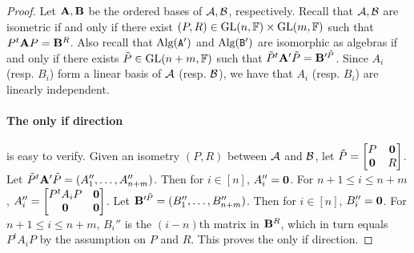 \documentclass[11pt]{article}
\begin{document}
\begin{proof}
Let $\mathbf{A},\mathbf{B}$ be the ordered bases of $\mathcal{A}, \mathcal{B}$, respectively. Recall that $\mathcal{A}, \mathcal{B}$ are isometric if and only if there exist 
$(P, R) \in\mathrm{GL}(n, \mathbb{F}) \times \mathrm{GL}(m, \mathbb{F})$ such that $P^t\mathbf{A} P=\mathbf{B}^R$. Also recall that 
$\text{Alg}(\mathtt{A}')$ and 
$\text{Alg}(\mathtt{B}')$ are isomorphic as algebras if and only if there exists $\tilde P\in\mathrm{GL}(n+m, \mathbb{F})$ 
such that $\tilde P^t\mathbf{A}' \tilde P=\mathbf{B}'^{\tilde P}$. Since $A_i$ (resp. $B_i$) form a linear basis of 
$\mathcal{A}$ (resp. $\mathcal{B}$), we have that $A_i$ (resp. 
$B_i$) are linearly independent.

\paragraph{The only if direction} is easy to verify. Given an isometry $(P, R)$ between 
$\mathcal{A}$ and $\mathcal{B}$, let $\tilde P=\begin{bmatrix}
P & \mathbf{0} \\
\mathbf{0} & R
\end{bmatrix}$. Let $\tilde P^t \mathbf{A}' \tilde P=(A_1'', \dots, A_{n+m}'')$. Then for $i\in[n]$, 
$A_i''=\mathbf{0}$. For $n+1\leq i\leq n+m$, $A_i''=\begin{bmatrix} P^t A_i P & \mathbf{0} \\
\mathbf{0} & \mathbf{0} \end{bmatrix}$. Let $\mathbf{B}'^{\tilde P}=(B_1'', \dots, B_{n+m}'')$. Then for 
$i\in[n]$, $B_i''=\mathbf{0}$. For $n+1\leq i\leq n+m$, $B_i''$ is the $(i-n)$th 
matrix in $\mathbf{B}^R$, which in turn equals $P^t A_i P$ by the assumption on $P$ and 
$R$. This proves the only if direction.


\end{proof}
\end{document}
